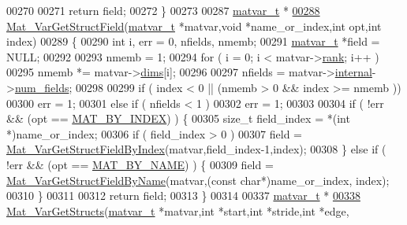 \begin{DoxyCode}
00270 
00271     \textcolor{keywordflow}{return} field;
00272 \}
00273 
00287 \hyperlink{group___m_a_t_structmatvar__t}{matvar\_t} *
\hyperlink{group___m_a_t_ga7018bfe6934b96ae32e8f2a1712eefab}{00288} \hyperlink{group___m_a_t_ga7018bfe6934b96ae32e8f2a1712eefab}{Mat\_VarGetStructField}(\hyperlink{group___m_a_t_structmatvar__t}{matvar\_t} *matvar,\textcolor{keywordtype}{void} *name\_or\_index,\textcolor{keywordtype}{int} opt,\textcolor{keywordtype}{int} index)
00289 \{
00290     \textcolor{keywordtype}{int}       i, err = 0, nfields, nmemb;
00291     \hyperlink{group___m_a_t_structmatvar__t}{matvar\_t} *field = NULL;
00292 
00293     nmemb = 1;
00294     \textcolor{keywordflow}{for} ( i = 0; i < matvar->\hyperlink{group___m_a_t_a84ba70c96ded13cc555fa75b768d9921}{rank}; i++ )
00295         nmemb *= matvar->\hyperlink{group___m_a_t_a8e01234e1c862ce3472bb37f5a09b92c}{dims}[i];
00296 
00297     nfields = matvar->\hyperlink{group___m_a_t_a6e97e3ed9f40c49322c18561c2a94e92}{internal}->\hyperlink{structmatvar__internal_a93fc447484f455eddf9334f2e9e411c2}{num\_fields};
00298 
00299     if ( index < 0 || (nmemb > 0 && index >= nmemb ))
00300         err = 1;
00301     \textcolor{keywordflow}{else} \textcolor{keywordflow}{if} ( nfields < 1 )
00302         err = 1;
00303 
00304     \textcolor{keywordflow}{if} ( !err && (opt == \hyperlink{group___m_a_t_gga03158cf3a896ec3d4f306b5e920109b4a69c57994e272a363f56cb3ba888b047e}{MAT\_BY\_INDEX}) ) \{
00305         \textcolor{keywordtype}{size\_t} field\_index = *(\textcolor{keywordtype}{int} *)name\_or\_index;
00306         \textcolor{keywordflow}{if} ( field\_index > 0 )
00307             field = \hyperlink{group___m_a_t_ga03ab2d89f683f9ccb4785fb255b14e0b}{Mat\_VarGetStructFieldByIndex}(matvar,field\_index-1,index);
00308     \} \textcolor{keywordflow}{else} \textcolor{keywordflow}{if} ( !err && (opt == \hyperlink{group___m_a_t_gga03158cf3a896ec3d4f306b5e920109b4a26c82f22528c705191141491a072db3e}{MAT\_BY\_NAME}) ) \{
00309         field = \hyperlink{group___m_a_t_ga619d241b49ce97334a38add60562c7be}{Mat\_VarGetStructFieldByName}(matvar,(\textcolor{keyword}{const} \textcolor{keywordtype}{char}*)name\_or\_index,
      index);
00310     \}
00311 
00312     \textcolor{keywordflow}{return} field;
00313 \}
00314 
00337 \hyperlink{group___m_a_t_structmatvar__t}{matvar\_t} *
\hyperlink{group___m_a_t_ga509178d7dc15faf9f7cd0440df6009b9}{00338} \hyperlink{group___m_a_t_ga509178d7dc15faf9f7cd0440df6009b9}{Mat\_VarGetStructs}(\hyperlink{group___m_a_t_structmatvar__t}{matvar\_t} *matvar,\textcolor{keywordtype}{int} *start,\textcolor{keywordtype}{int} *stride,\textcolor{keywordtype}{int} *edge,

\end{DoxyCode}

